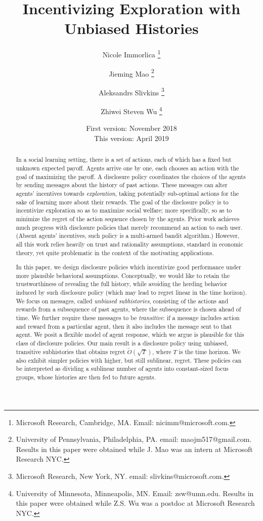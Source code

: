 \documentclass[11pt]{article}
\title{Incentivizing Exploration with Unbiased Histories}
\date{First version: November 2018\\This version: April 2019}
\author{
Nicole Immorlica \thanks{Microsoft Research, Cambridge, MA. Email: nicimm@microsoft.com.}
\and
Jieming Mao \thanks{University of Pennsylvania, Philadelphia, PA. email: maojm517@gmail.com. Results in this paper were obtained while J. Mao was an intern at Microsoft Research NYC.}
\and
Aleksandrs Slivkins  \thanks{Microsoft Research, New York, NY. email: slivkins@microsoft.com.}
\and
Zhiwei Steven Wu  \thanks{University of Minnesota, Minneapolis, MN. Email: zsw@umn.edu. Results in this paper were obtained while Z.S. Wu was a postdoc at Microsoft Research NYC.}
}
\begin{document}
\maketitle

\begin{abstract}

In a social learning setting, there is a set of actions, each of which has a fixed but unknown expected payoff. Agents arrive one by one, each chooses an action with the goal of maximizing the payoff.  A disclosure policy coordinates the choices of the agents by sending messages about the history of past actions. These messages can alter agents' incentives towards \emph{exploration}, taking potentially sub-optimal actions for the sake of learning more about their rewards. The goal of the disclosure policy is to incentivize exploration so as  to maximize social welfare; more specifically, so as to minimize the regret of the action sequence chosen by the agents. Prior work achieves much progress with disclosure policies that merely recommend an action to each user. (Absent agents' incentives, such policy is a multi-armed bandit algorithm.) However, all this work relies heavily on trust and rationality assumptions, standard in economic theory, yet quite problematic in the context of the motivating applications.

In this paper, we design disclosure policies which incentivize good performance under more plausible behavioral assumptions. Conceptually, we would like to retain the trustworthiness of revealing the full history, while avoiding the herding behavior induced by such disclosure policy (which may lead to regret linear in the time horizon). We focus on messages, called {\em unbiased subhistories}, consisting of the actions and rewards from a subsequence of past agents, where the subsequence is chosen ahead of time. We further require these messages to be \emph{transitive}: if a message includes action and reward from a particular agent, then it also includes the message sent to that agent. We posit a flexible model of agent response, which we argue is plausible for this class of disclosure policies. Our main result is a disclosure policy using unbiased, transitive subhistories that obtains regret $\tilde{O}(\sqrt{T})$, where $T$ is the time horizon.  We also exhibit simpler policies with higher, but still sublinear, regret.  These policies can be interpreted as dividing a sublinear number of agents into constant-sized focus groups, whose histories are then fed to future agents.
\end{abstract}
\end{document}
